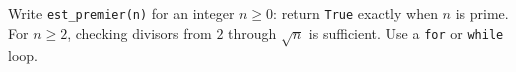 Write \texttt{est\_premier(n)} for an integer $n\ge0$: return \texttt{True} exactly when $n$ is prime. For $n\ge2$, checking divisors from $2$ through $\sqrt n$ is sufficient. Use a \texttt{for} or \texttt{while} loop.
